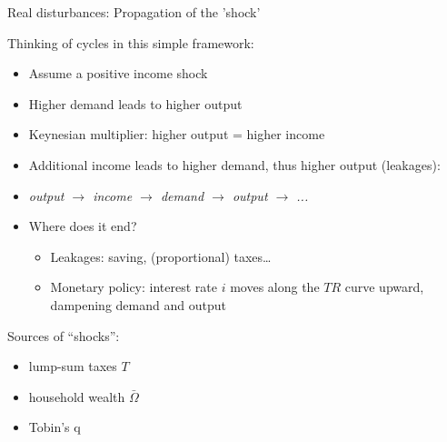 \documentclass{beamer}
\begin{document}
\begin{frame}{Real disturbances: Propagation of the 'shock'}

  Thinking of cycles in this simple framework:
\begin{itemize}
\small
\item Assume a positive income shock
\item Higher demand leads to higher output
\item Keynesian multiplier: higher output = higher income
\item Additional income leads to higher demand, thus higher output (leakages):
\item \emph{output $\rightarrow$ income $\rightarrow$ demand $\rightarrow$ output $\rightarrow$ ...}
\item Where does it end?
\begin{itemize}
\small
\item Leakages: saving, (proportional) taxes\dots %
\item Monetary policy: interest rate $i$ moves along the $TR$ curve upward, dampening demand and output
\end{itemize}
\end{itemize}
Sources of ``shocks'':
\begin{itemize}
\small
\item lump-sum taxes $T$
\item household wealth $\bar{\Omega}$
\item Tobin's q
\end{itemize}

\end{frame}
\end{document}
